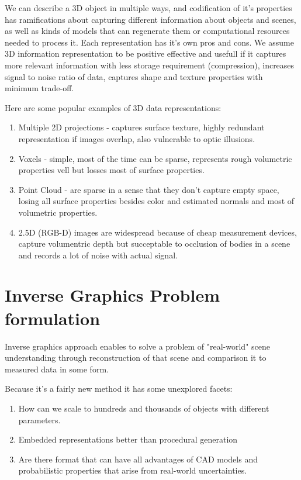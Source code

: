 We can describe a 3D object in multiple ways, and codification of it's properties has ramifications about capturing different information about objects and scenes, as well as kinds of models that can regenerate them or computational resources needed to process it.
Each representation has it's own pros and cons. We assume 3D information representation to be positive effective and usefull if it captures more relevant information with less storage requirement (compression), increases signal to noise ratio of data, captures shape and texture properties with minimum trade-off.

Here are some popular examples of 3D data representations:
\begin{enumerate}
	\item Multiple 2D projections - captures surface texture, highly redundant representation if images overlap, also vulnerable to optic illusions.
	\item Voxels - simple, most of the time can be sparse, represents rough volumetric properties vell but losses most of surface properties.
	\item Point Cloud - are sparse in a sense that they don't capture empty space, losing all surface properties besides color and estimated normals and most of volumetric properties.
	\item 2.5D (RGB-D) images are widespread because of cheap measurement devices, capture volumentric depth but succeptable to occlusion of bodies in a scene and records a lot of noise with actual signal.
\end{enumerate}


\section{Inverse Graphics Problem formulation}

\cite{rezende2016unsupervised,eslami2016attend,kulkarni2015deep,wu20153d,2016arXiv160805137I}

Inverse graphics approach enables to solve a problem of "real-world" scene understanding through reconstruction of that scene and comparison it to measured data in some form.

Because it's a fairly new method it has some unexplored facets:
\begin{enumerate}
    \item How can we scale to hundreds and thousands of objects with different parameters.
    \item Embedded representations better than procedural generation
    \item Are there format that can have all advantages of CAD models and probabilistic properties that arise from real-world uncertainties.
\end{enumerate}

